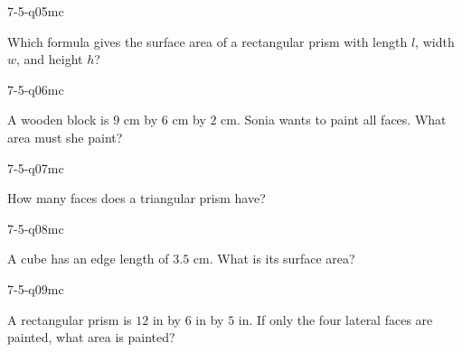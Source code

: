 \begin{practiceQuestion}{7-5-q05}{mc}
\begin{questionText}
Which formula gives the surface area of a rectangular prism with length $l$, width $w$, and height $h$?
\end{questionText}
\end{practiceQuestion}

\begin{practiceQuestion}{7-5-q06}{mc}
\begin{questionText}
A wooden block is $9$ cm by $6$ cm by $2$ cm. Sonia wants to paint all faces. What area must she paint?
\end{questionText}
\end{practiceQuestion}

\begin{practiceQuestion}{7-5-q07}{mc}
\begin{questionText}
How many faces does a triangular prism have?
\end{questionText}
\end{practiceQuestion}

\begin{practiceQuestion}{7-5-q08}{mc}
\begin{questionText}
A cube has an edge length of $3.5$ cm. What is its surface area?
\end{questionText}
\end{practiceQuestion}

\begin{practiceQuestion}{7-5-q09}{mc}
\begin{questionText}
A rectangular prism is $12$ in by $6$ in by $5$ in. If only the four lateral faces are painted, what area is painted?
\end{questionText}
\end{practiceQuestion}

